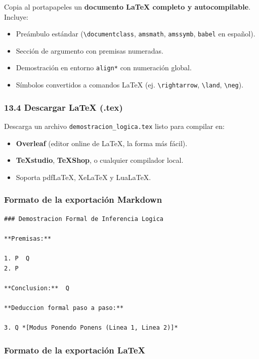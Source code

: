 \documentclass[11pt,a4paper]{article}
\begin{document}
Copia al portapapeles un \textbf{documento LaTeX completo y autocompilable}. Incluye:
\begin{itemize}[leftmargin=*]
\item Preámbulo estándar (\texttt{\textbackslash{}documentclass}, \texttt{amsmath}, \texttt{amssymb}, \texttt{babel} en español).
\item Sección de argumento con premisas numeradas.
\item Demostración en entorno \texttt{align*} con numeración global.
\item Símbolos convertidos a comandos LaTeX (ej. \texttt{\textbackslash{}rightarrow}, \texttt{\textbackslash{}land}, \texttt{\textbackslash{}neg}).
\end{itemize}

\subsubsection{13.4 Descargar LaTeX (.tex)}

Descarga un archivo \texttt{demostracion\_logica.tex} listo para compilar en:
\begin{itemize}[leftmargin=*]
\item \textbf{Overleaf} (editor online de LaTeX, la forma más fácil).
\item \textbf{TeXstudio}, \textbf{TeXShop}, o cualquier compilador local.
\item Soporta pdfLaTeX, XeLaTeX y LuaLaTeX.
\end{itemize}

\subsubsection{Formato de la exportación Markdown}

\begin{lstlisting}[language={},basicstyle=\ttfamily\scriptsize]
### Demostracion Formal de Inferencia Logica

**Premisas:**

1. P  Q
2. P

**Conclusion:**  Q

**Deduccion formal paso a paso:**

3. Q *[Modus Ponendo Ponens (Linea 1, Linea 2)]*
\end{lstlisting}

\subsubsection{Formato de la exportación LaTeX}
\end{document}
